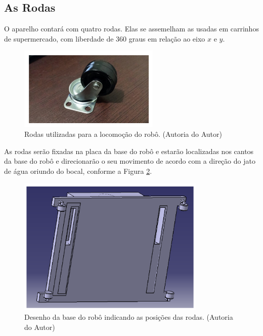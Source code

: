 \subsection{As Rodas}
O aparelho contará com quatro rodas. Elas se assemelham as usadas em carrinhos de supermercado, com liberdade de 360 graus em relação ao eixo $x$ e $y$.
\par
  \begin{figure}[h]
    \centering
    \includegraphics[width=0.6\textwidth]{figures/wheel-market.png}
    \caption{Rodas utilizadas para a locomoção do robô. (\textsf{Autoria do Autor})}
    \label{fig:wheel-market}
  \end{figure}
  \FloatBarrier
\par
As rodas serão fixadas na placa da base do robô e estarão localizadas nos cantos da base do robô e direcionarão o seu movimento de acordo com a direção do jato de água oriundo do bocal, conforme a Figura \ref{fig:catia-base}.
\par
  \begin{figure}[h]
    \centering
    \includegraphics[width=0.8\textwidth]{figures/catia-base.png}
    \caption{Desenho da base do robô indicando as posições das rodas. (\textsf{Autoria do Autor})}
    \label{fig:catia-base}
  \end{figure}
  \FloatBarrier
\par
